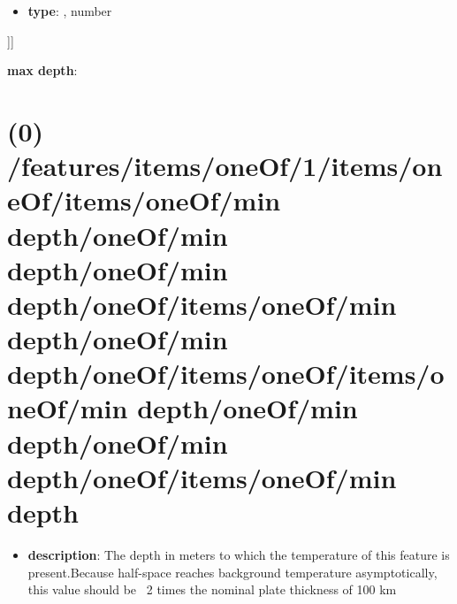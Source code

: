 \begin{itemize}[leftmargin=5em]\item {\bf type}: , number\end{itemize}]]\item {\bf max depth}: \section{(0) /features/items/oneOf/1/items/oneOf/items/oneOf/min depth/oneOf/min depth/oneOf/min depth/oneOf/items/oneOf/min depth/oneOf/min depth/oneOf/items/oneOf/items/oneOf/min depth/oneOf/min depth/oneOf/min depth/oneOf/items/oneOf/min depth}
\begin{itemize}[leftmargin=0em]\item {\bf description}: The depth in meters to which the temperature of this feature is present.Because half-space reaches background temperature asymptotically, this value should be ~2 times the nominal plate thickness of 100 km
\end{itemize}
